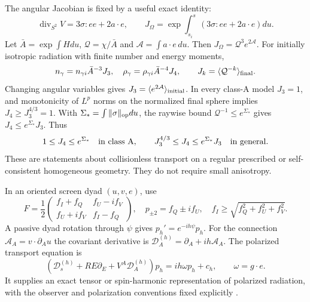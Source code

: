 The angular Jacobian is fixed by a useful exact identity:
\begin{equation}
 \operatorname{div}_{S^2}V=3\sigma:ee+2a\cdot e,
 \qquad
 J_\Omega=\exp\!\int_{s_i}^{s}(3\sigma:ee+2a\cdot e)du.
 \label{ii:angular_jacobian}
\end{equation}
Let $\bar A=\exp\int Hdu$, $\mathcal Q=\chi/\bar A$ and
$\mathcal A=\int a\cdot e\,du$. Then $J_\Omega=\mathcal Q^3e^{2\mathcal A}$. For initially isotropic radiation with finite number and energy moments,
\begin{equation}
 n_\gamma=n_{\gamma i}\bar A^{-3}J_3,\quad
 \rho_\gamma=\rho_{\gamma i}\bar A^{-4}J_4,\qquad
 J_k=\langle\mathcal Q^{-k}\rangle_{\rm final}.
 \label{ii:moment_distortion}
\end{equation}
Changing angular variables gives $J_3=\langle e^{2\mathcal A}\rangle_{\rm initial}$. In every class-A model $J_3=1$, and monotonicity of $L^p$ norms on the normalized final sphere implies $J_4\ge J_3^{4/3}=1$. With
$\Sigma_* =\int\|\sigma\|_{\rm op}du$, the raywise bound $\mathcal Q^{-1}\le e^{\Sigma_*}$ gives $J_4\le e^{\Sigma_*}J_3$. Thus
\begin{equation}
 1\le J_4\le e^{\Sigma_*}\quad\hbox{in class A},\qquad
 J_3^{4/3}\le J_4\le e^{\Sigma_*}J_3\quad\hbox{in general}.
 \label{ii:classA_energy_bound}
\end{equation}
These are statements about collisionless transport on a regular prescribed or self-consistent homogeneous geometry. They do not require small anisotropy.

In an oriented screen dyad $(u,v,e)$, use
\begin{equation}
 F=\frac12\begin{pmatrix}f_I+f_Q&f_U-if_V\\f_U+if_V&f_I-f_Q\end{pmatrix},
 \quad p_{\pm2}=f_Q\pm if_U,
 \quad f_I\ge\sqrt{f_Q^2+f_U^2+f_V^2}.
 \label{ii:stokes}
\end{equation}
A passive dyad rotation through $\psi$ gives $p_h'=e^{-ih\psi}p_h$. For the connection $\mathcal A_A=v\cdot\partial_Au$ the covariant derivative is
$\mathscr D_A^{(h)}=\partial_A+ih\mathcal A_A$. The polarized transport equation is
\begin{equation}
 (\mathscr D_s^{(h)}+RE\partial_E+V^A\mathscr D_A^{(h)})p_h
                         =ih\omega p_h+c_h,\qquad \omega=g\cdot e.
 \label{ii:spin_transport}
\end{equation}
It supplies an exact tensor or spin-harmonic representation of polarized radiation, with the observer and polarization conventions fixed explicitly \cite{Challinor2000,Pitrou2021}.

